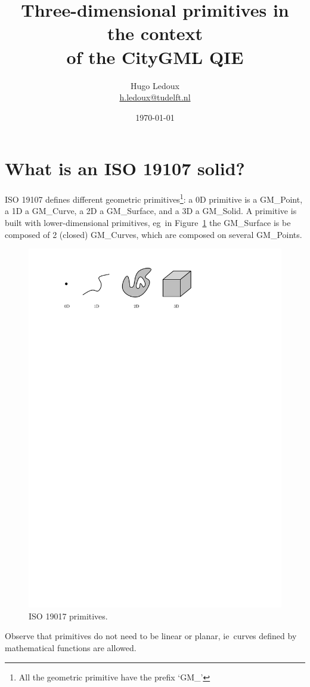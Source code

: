 \documentclass[a4paper,parskip=half,11pt]{scrartcl}
\title{Three-dimensional primitives in the context\\ of the CityGML QIE}
\author{Hugo Ledoux\\ \url{h.ledoux@tudelft.nl}}
\date{\today}
\newcommand{\ie}{ie}
\newcommand{\eg}{eg}
\begin{document}
\maketitle



%
\section{What is an ISO 19107 solid?}

ISO 19107 defines different geometric primitives\footnote{All the geometric primitive have the prefix `GM\_'}: a 0D primitive is a GM\_Point, a 1D a GM\_Curve, a 2D a GM\_Surface, and a 3D a GM\_Solid.
A primitive is built with lower-dimensional primitives, \eg\ in Figure~\ref{fig:isoprimitives} the GM\_Surface is be composed of 2 (closed) GM\_Curves, which are composed on several GM\_Points.
\begin{figure}
  \centering
  \includegraphics[width=0.8\linewidth]{figs/isoprimitives.pdf}
  \caption{ISO 19017 primitives.}
\label{fig:isoprimitives}
\end{figure}
Observe that primitives do not need to be linear or planar, \ie\ curves defined by mathematical functions are allowed.
\end{document}
